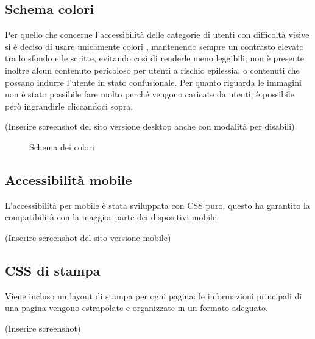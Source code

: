	\subsection{Schema colori}
	\par Per quello che concerne l’accessibilità delle categorie di utenti con difficoltà visive si è deciso di usare unicamente colori , mantenendo sempre un contrasto elevato tra lo sfondo e le scritte, evitando così di renderle meno leggibili; non è presente inoltre alcun contenuto pericoloso per utenti a rischio epilessia, o contenuti che possano indurre l’utente in stato confusionale. 
Per quanto riguarda le immagini non è stato possibile fare molto perché vengono caricate da utenti, è possibile però ingrandirle cliccandoci sopra.
	\par(Inserire screenshot del sito versione desktop anche con modalità per disabili)
	\begin{figure}[!htb]
		\caption{\label{fig:ganttAnalisi} Schema dei colori}
	\end{figure}
	\subsection{Accessibilità mobile}
	\par L’accessibilità per mobile è stata sviluppata con CSS puro, questo ha garantito la compatibilità con la maggior parte dei dispositivi mobile.
	\par(Inserire screenshot del sito versione mobile)
	\subsection{CSS di stampa}
	\par Viene incluso un layout di stampa per ogni pagina: le informazioni principali di una pagina vengono estrapolate e organizzate in un formato adeguato.
	\par (Inserire screenshot)
	



